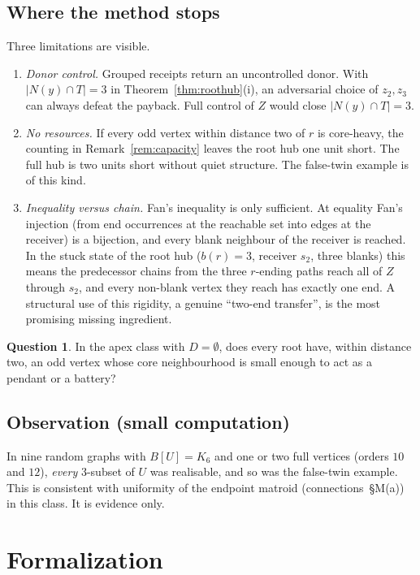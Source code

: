 \documentclass[11pt]{amsart}
\theoremstyle{definition}
\newtheorem{question}[theorem]{Question}
\begin{document}
\subsection*{Where the method stops} Three limitations are visible.
\begin{enumerate}
\item \emph{Donor control.} Grouped receipts return an uncontrolled donor. With
$|N(y)\cap T|=3$ in Theorem~\ref{thm:roothub}(i), an adversarial choice of $z_2,z_3$ can always
defeat the payback. Full control of $Z$ would close $|N(y)\cap T|=3$.
\item \emph{No resources.} If every odd vertex within distance two of $r$ is core-heavy, the
counting in Remark~\ref{rem:capacity} leaves the root hub one unit short. The full hub is two
units short without quiet structure. The false-twin example is of this kind.
\item \emph{Inequality versus chain.} Fan's inequality is only sufficient. At equality Fan's
injection (from end occurrences at the reachable set into edges at the receiver) is a bijection,
and every blank neighbour of the receiver is reached. In the stuck state of the root hub
($b(r)=3$, receiver $s_2$, three blanks) this means the predecessor chains from the three
$r$-ending paths reach all of $Z$ through $s_2$, and every non-blank vertex they reach has exactly
one end. A structural use of
this rigidity, a genuine ``two-end transfer'', is the most promising missing ingredient.
\end{enumerate}

\begin{question}
In the apex class with $D=\emptyset$, does every root have, within distance two, an odd vertex
whose core neighbourhood is small enough to act as a pendant or a battery?
\end{question}

\subsection*{Observation (small computation)} In nine random graphs with $B[U]=K_6$ and one or two
full vertices (orders $10$ and $12$), \emph{every} 3-subset of $U$ was realisable, and so was the
false-twin example. This is consistent with uniformity of the endpoint matroid
(connections~\S M(a)) in this class. It is evidence only.

\section{Formalization}\label{sec:lean}
\sloppy
\end{document}
